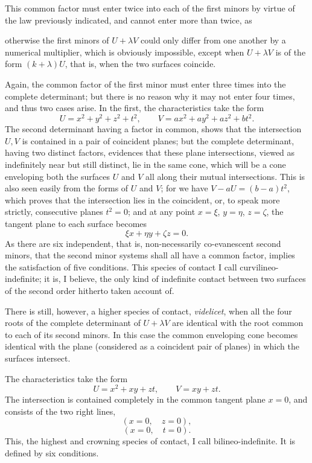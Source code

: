 \documentclass[11pt]{article}
\newcommand{\sourcepage}[1]{\marginpar{\scriptsize p.~#1}}
\begin{document}
{{This common factor must enter twice into each of the first minors by virtue of the law previously indicated, and cannot enter more than twice, as

\sourcepage{235}
otherwise the first minors of $U+\lambda V$ could only differ from one another by a numerical multiplier, which is obviously impossible, except when $U+\lambda V$ is of the form $(k+\lambda)U$, that is, when the two surfaces coincide.

Again, the common factor of the first minor must enter three times into the complete determinant; but there is no reason why it may not enter four times, and thus two cases arise. In the first, the characteristics take the form
\[
U=x^2+y^2+z^2+t^2,
\qquad
V=ax^2+ay^2+az^2+bt^2.
\]
The second determinant having a factor in common, shows that the intersection $U,V$ is contained in a pair of coincident planes; but the complete determinant, having two distinct factors, evidences that these plane intersections, viewed as indefinitely near but still distinct, lie in the same cone, which will be a cone enveloping both the surfaces $U$ and $V$ all along their mutual intersections. This is also seen easily from the forms of $U$ and $V$; for we have $V-aU=(b-a)t^2$, which proves that the intersection lies in the coincident, or, to speak more strictly, consecutive planes $t^2=0$; and at any point $x=\xi$, $y=\eta$, $z=\zeta$, the tangent plane to each surface becomes
\[
\xi x+\eta y+\zeta z=0.
\]
As there are six independent, that is, non-necessarily co-evanescent second minors, that the second minor systems shall all have a common factor, implies the satisfaction of five conditions. This species of contact I call curvilineo-indefinite; it is, I believe, the only kind of indefinite contact between two surfaces of the second order hitherto taken account of.

There is still, however, a higher species of contact, \emph{videlicet}, when all the four roots of the complete determinant of $U+\lambda V$ are identical with the root common to each of its second minors. In this case the common enveloping cone becomes identical with the plane (considered as a coincident pair of planes) in which the surfaces intersect.

The characteristics take the form
\[
U=x^2+xy+zt,
\qquad
V=xy+zt.
\]
The intersection is contained completely in the common tangent plane $x=0$, and consists of the two right lines,
\[
(x=0,\quad z=0),
\]
\[
(x=0,\quad t=0).
\]
This, the highest and crowning species of contact, I call bilineo-indefinite. It is defined by six conditions.

}}
\end{document}
